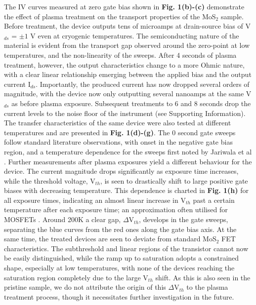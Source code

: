 \documentclass[%
 aip,
 jmp,%
 amsmath,amssymb,
 reprint,%
]{revtex4-1}
\begin{document}
\indent The IV curves measured at zero gate bias shown in \textbf{Fig. 1(b)-(c)} demonstrate the effect of plasma treatment on the transport properties of the MoS$_2$ sample. Before treatment, the device outputs tens of microamps at drain-source bias of V$_{ds}$ = $\pm 1$ V even at cryogenic temperatures. The semiconducting nature of the material is evident from the transport gap observed around the zero-point at low temperatures, and the non-linearity of the sweeps. After 4 seconds of plasma treatment, however, the output characteristics change to a more Ohmic nature, with a clear linear relationship emerging between the applied bias and the output current I$_{ds}$. Importantly, the produced current has now dropped several orders of magnitude, with the device now only outputting several nanoamps at the same V$_{ds}$ as before plasma exposure. Subsequent treatments to 6 and 8 seconds drop the current levels to the noise floor of the instrument (see Supporting Information). \newline
\indent The transfer characteristics of the same device were also tested at different temperatures and are presented in \textbf{Fig. 1(d)-(g)}. The 0 second gate sweeps follow standard literature observations, with onset in the negative gate bias region, and a temperature dependence for the sweeps first noted by Jariwala et al \cite{jariwala2013band}. Further measurements after plasma exposures yield a different behaviour for the device. The current magnitude drops significantly as exposure time increases, while the threshold voltage, V$_{th}$, is seen to drastically shift to large positive gate biases with decreasing temperature. This dependence is charted in \textbf{Fig. 1(h)} for all exposure times, indicating an almost linear increase in V$_{th}$ past a certain temperature after each exposure time; an approximation often utilised for MOSFETs \cite{filanovsky2001mutual}. \newline
\indent Around 200K a clear gap, $\Delta$V$_{th}$, develops in the gate sweeps, separating the blue curves from the red ones along the gate bias axis. At the same time, the treated devices are seen to deviate from standard MoS$_2$ FET characteristics. The subthreshold and linear regions of the transistor cannot now be easily distinguished, while the ramp up to saturation adopts a constrained shape, especially at low temperatures, with none of the devices reaching the saturation region completely due to the large V$_{th}$ shift. As this is also seen in the pristine sample, we do not attribute the origin of this $\Delta$V$_{th}$ to the plasma treatment process, though it necessitates further investigation in the future.
\end{document}
